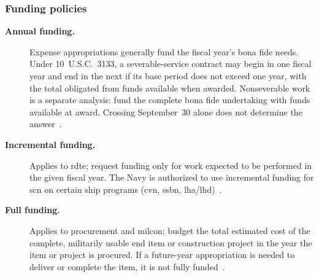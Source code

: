 \documentclass[../main.tex]{subfiles}
\begin{document}
\subsubsection{Funding policies}
\begin{description}
  \item[\textbf{Annual funding.}] Expense appropriations generally fund the fiscal year's bona fide needs. Under 10~U.S.C.\ 3133, a severable-service contract may begin in one fiscal year and end in the next if its base period does not exceed one year, with the total obligated from funds available when awarded. Nonseverable work is a separate analysis: fund the complete bona fide undertaking with funds available at award. Crossing September~30 alone does not determine the answer~\autocite{USC-10-3133,DoDFMR-Vol2A-Ch1,edo-3-1-3-program-funding-2025}.
  \item[\textbf{Incremental funding.}] Applies to \ac{rdte}; request funding only for work expected to be performed in the given fiscal year. The Navy is authorized to use incremental funding for \ac{scn} on certain ship programs (\ac{cvn}, \ac{ssbn}, \ac{lha}/\ac{lhd})~\autocite{edo-3-1-3-program-funding-2025,DoDFMR-Vol2A-Ch1}.
  \item[\textbf{Full funding.}] Applies to procurement and \ac{milcon}; budget the total estimated cost of the complete, militarily usable end item or construction project in the year the item or project is procured. If a future-year appropriation is needed to deliver or complete the item, it is not fully funded~\autocite{edo-3-1-3-program-funding-2025,DoDFMR-Vol2A-Ch1}.
\end{description}


\end{document}

